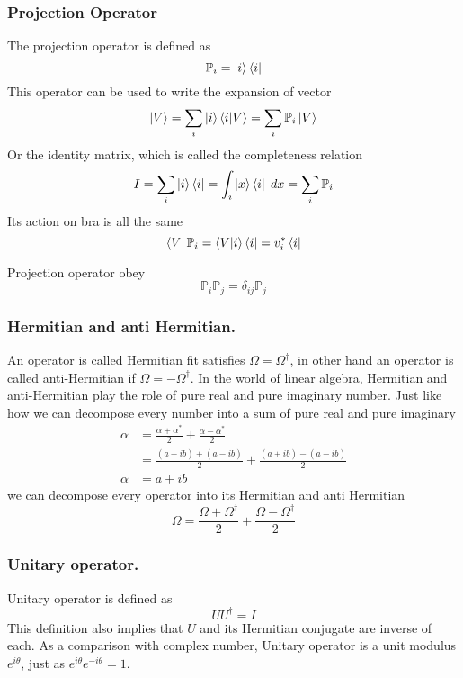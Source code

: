 \documentclass[../main.tex]{subfiles}
\begin{document}
\subsubsection*{Projection Operator}
The projection operator is defined as
\begin{equation*}
	\mathbb{P}_i=\ket{i}\bra{i}
\end{equation*}
This operator can be used to write the expansion of vector
\begin{equation*}
	\ket{V}=\sum_i \ket{i}\braket{i|V}=\sum_i \mathbb{P}_i \ket{V}
\end{equation*}
Or the identity matrix, which is called the completeness relation
\begin{equation*}
	{I}=\sum_i \ket{i}\bra{i}=\int_i \ket{x}\bra{i}\;dx=\sum_i \mathbb{P}_i
\end{equation*}
Its action on bra is all the same
\begin{equation*}
	\bra{V}\mathbb{P}_i=\braket{V|i}\bra{i}=v_i^*\bra{i}
\end{equation*}

Projection operator obey
\begin{equation*}
	\mathbb{P}_i\mathbb{P}_j=\delta_{ij}\mathbb{P}_j
\end{equation*}

\subsubsection*{Hermitian and anti Hermitian.}
An operator is called Hermitian fit satisfies $\Omega=\Omega ^\dagger$, in other hand an operator is called anti-Hermitian if $\Omega=-\Omega ^\dagger$.
In the world of linear algebra, Hermitian and anti-Hermitian play the role of pure real and pure imaginary number.
Just like how we can decompose every number into a sum of pure real and pure imaginary
\begin{align*}
	\alpha & =\frac{\alpha+\alpha ^*}{2}+\frac{\alpha-\alpha ^*}{2} \\
	       & =\frac{(a+ib)+(a-ib)}{2}+\frac{(a+ib)-(a-ib)}{2}       \\
	\alpha & =a+ib
\end{align*}
we can decompose every operator into its Hermitian and anti Hermitian
\begin{equation*}
	\Omega=\frac{\Omega+\Omega ^\dagger}{2}+\frac{\Omega-\Omega ^\dagger}{2}
\end{equation*}

\subsubsection*{Unitary operator.}
Unitary operator is defined as
\begin{equation*}
	UU ^\dagger=I
\end{equation*}
This definition also implies that $U$ and its Hermitian conjugate are inverse of each.
As a comparison with complex number, Unitary operator is a unit modulus $e^{i\theta}$, just as $e^{i\theta}e^{-i\theta}=1$.
\end{document}
